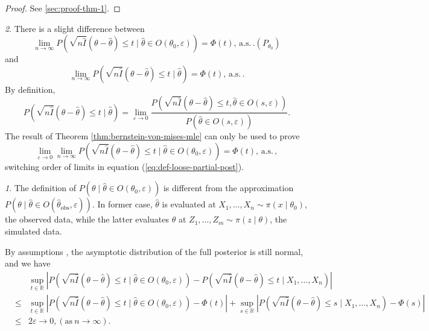 \documentclass[oneside,english]{amsbook}
\numberwithin{section}{chapter}
\numberwithin{equation}{section}
\numberwithin{figure}{section}
\theoremstyle{plain}
\theoremstyle{plain}
\theoremstyle{definition}
\theoremstyle{plain}
\theoremstyle{plain}
\theoremstyle{remark}
\newtheorem{rem}{\protect\remarkname}
\theoremstyle{definition}
\theoremstyle{definition}
\newcommand{\ascv}{\,\mathrm{a.s.}\,}
\providecommand{\remarkname}{Remark}
\begin{document}
\begin{proof}
See  \ref{sec:proof-thm-1}.\end{proof}
\begin{rem}
There is a slight difference between 
\[
\lim_{n\rightarrow\infty}P\left(\sqrt{n\hat{I}}\left(\theta-\hat{\theta}\right)\le t\mid\hat{\theta}\in O\left(\theta_{0},\varepsilon\right)\right)=\Phi\left(t\right),\ascv.\left(P_{\theta_{0}}\right)
\]
and 
\[
\lim_{n\rightarrow\infty}P\left(\sqrt{n\hat{I}}\left(\theta-\hat{\theta}\right)\le t\mid\hat{\theta}\right)=\Phi\left(t\right),\ascv.
\]
By definition, 
\begin{equation}
P\left(\sqrt{n\hat{I}}\left(\theta-\hat{\theta}\right)\le t\mid\hat{\theta}\right)=\lim_{\varepsilon\rightarrow0}\frac{P\left(\sqrt{n\hat{I}}\left(\theta-\hat{\theta}\right)\le t,\hat{\theta}\in O\left(s,\varepsilon\right)\right)}{P\left(\hat{\theta}\in O\left(s,\varepsilon\right)\right)}.\label{eq:def-loose-partial-post}
\end{equation}
The result of Theorem \ref{thm:bernstein-von-mises-mle} can only
be used to prove 
\[
\lim_{\varepsilon\rightarrow0}\lim_{n\rightarrow\infty}P\left(\sqrt{n\hat{I}}\left(\theta-\hat{\theta}\right)\le t\mid\hat{\theta}\in O\left(\theta_{0},\varepsilon\right)\right)=\Phi\left(t\right),\ascv,
\]
switching order of limits in equation (\ref{eq:def-loose-partial-post}). 
\begin{rem}
The definition of $P\left(\theta\mid\hat{\theta}\in O\left(\theta_{0},\varepsilon\right)\right)$
is different from the approximation $P\left(\theta\mid\hat{\theta}\in O\left(\hat{\theta}_{\mathrm{obs}},\varepsilon\right)\right)$.
In former case, $\hat{\theta}$ is evaluated at $X_{1},\ldots,X_{n}\sim\pi\left(x\mid\theta_{0}\right)$,
the observed data, while the latter evaluates $\hat{\theta}$ at $Z_{1},\ldots,Z_{m}\sim\pi\left(z\mid\theta\right)$,
the simulated data. 
\end{rem}
\end{rem}
By {assumptions }, the asymptotic
distribution of the full posterior is still normal, and we have 
\begin{eqnarray*}
 &  & \sup_{t\in\mathbb{R}}\left|P\left(\sqrt{n\hat{I}}\left(\theta-\hat{\theta}\right)\le t\mid\hat{\theta}\in O\left(\theta_{0},\varepsilon\right)\right)-P\left(\sqrt{n\hat{I}}\left(\theta-\hat{\theta}\right)\le t\mid X_{1},\ldots,X_{n}\right)\right|\\
 & \le & \sup_{t\in\mathbb{R}}\left|P\left(\sqrt{n\hat{I}}\left(\theta-\hat{\theta}\right)\le t\mid\hat{\theta}\in O\left(\theta_{0},\varepsilon\right)\right)-\Phi\left(t\right)\right|+\sup_{s\in\mathbb{R}}\left|P\left(\sqrt{n\hat{I}}\left(\theta-\hat{\theta}\right)\le s\mid X_{1},\ldots,X_{n}\right)-\Phi\left(s\right)\right|\\
 & \le & 2\varepsilon\rightarrow0,\left(\mathrm{as}\: n\rightarrow\infty\right).
\end{eqnarray*}
\end{document}
